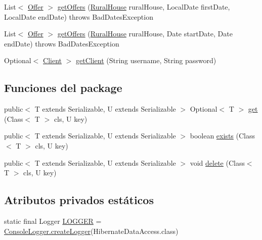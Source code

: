 \begin{DoxyCompactItemize}
List$<$ \mbox{\hyperlink{classcom_1_1ruralhousejsf_1_1domain_1_1_offer}{Offer}} $>$ \mbox{\hyperlink{classcom_1_1ruralhousejsf_1_1data_access_1_1_hibernate_data_access_a54bd9542b20644ccd47961ca260d17b4}{get\+Offers}} (\mbox{\hyperlink{classcom_1_1ruralhousejsf_1_1domain_1_1_rural_house}{Rural\+House}} rural\+House, Local\+Date first\+Date, Local\+Date end\+Date)  throws Bad\+Dates\+Exception 
\item 
List$<$ \mbox{\hyperlink{classcom_1_1ruralhousejsf_1_1domain_1_1_offer}{Offer}} $>$ \mbox{\hyperlink{classcom_1_1ruralhousejsf_1_1data_access_1_1_hibernate_data_access_ad428053d12fae95599312c13951f9c87}{get\+Offers}} (\mbox{\hyperlink{classcom_1_1ruralhousejsf_1_1domain_1_1_rural_house}{Rural\+House}} rural\+House, Date start\+Date, Date end\+Date)  throws Bad\+Dates\+Exception 
\item 
Optional$<$ \mbox{\hyperlink{classcom_1_1ruralhousejsf_1_1domain_1_1_client}{Client}} $>$ \mbox{\hyperlink{classcom_1_1ruralhousejsf_1_1data_access_1_1_hibernate_data_access_a6df6a0502595b73be0f6d238743eeda5}{get\+Client}} (String username, String password)
\end{DoxyCompactItemize}
\subsection*{Funciones del \textquotesingle{}package\textquotesingle{}}
\begin{DoxyCompactItemize}
\item 
public$<$ T extends Serializable, U extends Serializable $>$ Optional$<$ T $>$ \mbox{\hyperlink{classcom_1_1ruralhousejsf_1_1data_access_1_1_hibernate_data_access_a0620c099395860e9df083998f4f73f7d}{get}} (Class$<$ T $>$ cls, U key)
\item 
public$<$ T extends Serializable, U extends Serializable $>$ boolean \mbox{\hyperlink{classcom_1_1ruralhousejsf_1_1data_access_1_1_hibernate_data_access_a0f782c671d6feb48f69a3128fe5e3484}{exists}} (Class$<$ T $>$ cls, U key)
\item 
public$<$ T extends Serializable, U extends Serializable $>$ void \mbox{\hyperlink{classcom_1_1ruralhousejsf_1_1data_access_1_1_hibernate_data_access_a4f8656939c9f559fa536850957dce8ce}{delete}} (Class$<$ T $>$ cls, U key)
\end{DoxyCompactItemize}
\subsection*{Atributos privados estáticos}
\begin{DoxyCompactItemize}
\item 
static final Logger \mbox{\hyperlink{classcom_1_1ruralhousejsf_1_1data_access_1_1_hibernate_data_access_a3f050c37956274b82491f5fcf9ce5db1}{L\+O\+G\+G\+ER}} = \mbox{\hyperlink{classcom_1_1ruralhousejsf_1_1logger_1_1_console_logger_a520321643663e37d95761134a35505cd}{Console\+Logger.\+create\+Logger}}(Hibernate\+Data\+Access.\+class)
\end{DoxyCompactItemize}


